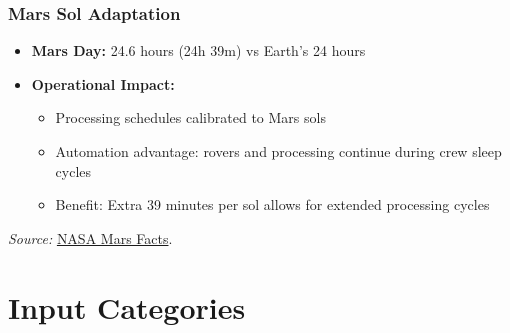 \documentclass[12pt, a4paper]{article}
\begin{document}
\subsubsection{Mars Sol Adaptation}
\begin{itemize}
    \item \textbf{Mars Day:} 24.6 hours (24h 39m) vs Earth's 24 hours
    \item \textbf{Operational Impact:}
    \begin{itemize}
        \item Processing schedules calibrated to Mars sols
        \item Automation advantage: rovers and processing continue during crew sleep cycles
        \item Benefit: Extra 39 minutes per sol allows for extended processing cycles
    \end{itemize}
\end{itemize}

\noindent\textit{Source:} \href{https://science.nasa.gov/mars/facts/}{NASA Mars Facts}.

\section{Input Categories}
\end{document}
